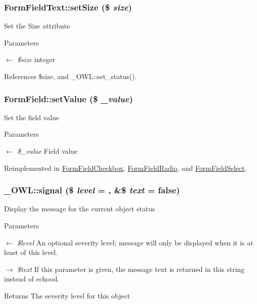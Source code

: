 \subsubsection[{setSize}]{\setlength{\rightskip}{0pt plus 5cm}FormFieldText::setSize (\$ {\em size})}\label{classFormFieldText_a045b0853ed6e7777c7f3dddbadf31f5f}
Set the Size attribute 
\begin{DoxyParams}{Parameters}
\item[\mbox{$\leftarrow$} {\em \$size}]integer \end{DoxyParams}


References \$size, and \_\-OWL::set\_\-status().

\subsubsection[{setValue}]{\setlength{\rightskip}{0pt plus 5cm}FormField::setValue (\$ {\em \_\-value})}\label{classFormField_a465ff61e290d82be96bb793c3a14b3e7}
Set the field value 
\begin{DoxyParams}{Parameters}
\item[\mbox{$\leftarrow$} {\em \$\_\-value}]Field value \end{DoxyParams}


Reimplemented in \hyperlink{classFormFieldCheckbox_a787abee157599c389a18e0810f69fed5}{FormFieldCheckbox}, \hyperlink{classFormFieldRadio_aab105e92866fd80890d3254f51a2e4ca}{FormFieldRadio}, and \hyperlink{classFormFieldSelect_ae69f5b352df63796c048dca6a2de7544}{FormFieldSelect}.

\subsubsection[{signal}]{\setlength{\rightskip}{0pt plus 5cm}\_\-OWL::signal (\$ {\em level} = {}, \/  \&\$ {\em text} = {\ttfamily false})}\label{class__OWL_a51ba4a16409acf2a2f61f286939091a5}
Display the message for the current object status


\begin{DoxyParams}{Parameters}
\item[\mbox{$\leftarrow$} {\em \$level}]An optional severity level; message will only be displayed when it is at least of this level. \item[\mbox{$\rightarrow$} {\em \$text}]If this parameter is given, the message text is returned in this string instead of echood. \end{DoxyParams}
\begin{DoxyReturn}{Returns}
The severity level for this object 
\end{DoxyReturn}


